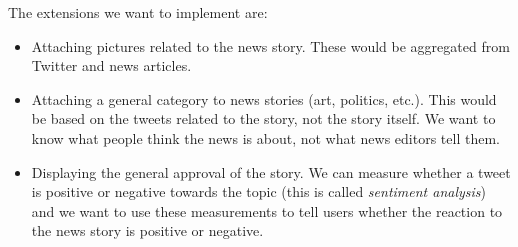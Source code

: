 \documentclass[a4paper,12pt]{article}
\begin{document}
  The extensions we want to implement are:
  \begin{itemize}
   \item Attaching pictures related to the news story. These would be aggregated from Twitter and news articles.
   \item Attaching a general category to news stories (art, politics, etc.). This would be based on the tweets related to the story, not the story itself. We want to know what people think the news is about, not what news editors tell them.
   \item Displaying the general approval of the story. We can measure whether a tweet is positive or negative towards the topic (this is called \emph{sentiment analysis}) and we want to use these measurements to tell users whether the reaction to the news story is positive or negative.
  \end{itemize}
\end{document}
